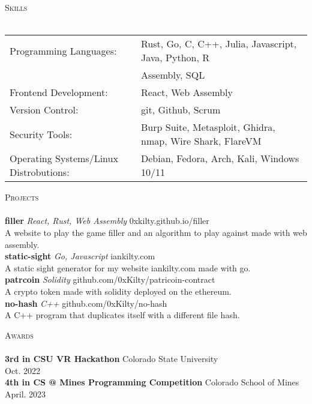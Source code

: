 \documentclass[a4paper]{article}
\newcommand{\lineunder} {
    \vspace*{-8pt} \\
    \hspace*{-18pt} \hrulefill \\
}
\newcommand{\header} [1] {
    {\hspace*{-18pt}\vspace*{6pt} \textsc{#1}}
    \vspace*{-6pt} \lineunder
}
\begin{document}
\header{Skills}
\begin{tabular}{ l l }
	Programming Languages:                 & Rust, Go, C, C++, Julia, Javascript, Java, Python, R\\
                                           & Assembly, SQL \\
	Frontend Development:                  & React, Web Assembly \\
	Version Control:                       & git, Github, Scrum \\
    Security Tools:                        & Burp Suite, Metasploit, Ghidra, nmap, Wire Shark, FlareVM \\
	Operating Systems/Linux Distrobutions: & Debian, Fedora, Arch, Kali, Windows 10/11 \\
\end{tabular}
\vspace{2mm}

\header{Projects}
{\textbf{filler}} {\sl React, Rust, Web Assembly} \hfill 0xkilty.github.io/filler\\
A website to play the game \textquotedbl{}filler\textquotedbl{} and an algorithm to play against made with web assembly.\\
\vspace*{2mm}
{\textbf{static-sight}} {\sl Go, Javascript} \hfill iankilty.com\\
A static sight generator for my website iankilty.com made with go.\\
\vspace*{2mm}
{\textbf{patrcoin}} {\sl Solidity} \hfill github.com/0xKilty/patricoin-contract\\
A crypto token made with solidity deployed on the ethereum.\\
\vspace*{2mm}
{\textbf{no-hash}} {\sl C++} \hfill github.com/0xKilty/no-hash\\
A C++ program that duplicates itself with a different file hash.\\
\vspace*{2mm}

\header{Awards}
\textbf{3rd in CSU VR Hackathon} \hfill Colorado State University\\
\hfill Oct. 2022\\
\vspace*{2mm}
\textbf{4th in CS @ Mines Programming Competition} \hfill Colorado School of Mines\\
\hfill April. 2023\\
\vspace*{2mm}
\end{document}
